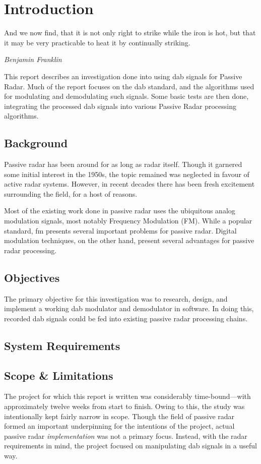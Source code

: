 \documentclass[class=report,11pt,crop=false]{standalone}
\begin{document}
\chapter{Introduction}
\epigraph{And we now find, that it is not only right to strike while the iron is hot, but that it may be very practicable to heat it by continually striking.}%
    {\emph{Benjamin Franklin}}

This report describes an investigation done into using \acrfull{dab} signals for Passive Radar. Much of the report focuses on the \acrshort{dab} standard, and the algorithms used for modulating and demodulating such signals. Some basic tests are then done, integrating the processed \acrshort{dab} signals into various Passive Radar processing algorithms.

\section{Background}
Passive radar has been around for as long as radar itself. Though it garnered some initial interest in the 1950s, the topic remained was neglected in favour of active radar systems. However, in recent decades there has been fresh excitement surrounding the field, for a host of reasons.

Most of the existing work done in passive radar uses the ubiquitous analog modulation signals, most notably Frequency Modulation (FM). While a popular standard, \acrfull{fm} presents several important problems for passive radar. Digital modulation techniques, on the other hand, present several advantages for passive radar processing.

\section{Objectives}
The primary objective for this investigation was to research, design, and implement a working \acrshort{dab} modulator and demodulator in software. In doing this, recorded \acrshort{dab} signals could be fed into existing passive radar processing chains. 

\section{System Requirements}

\section{Scope \& Limitations}
The project for which this report is written was considerably time-bound---with approximately twelve weeks from start to finish. Owing to this, the study was intentionally kept fairly narrow in scope. Though the field of passive radar formed an important underpinning for the intentions of the project, actual passive radar \emph{implementation} was not a primary focus. Instead, with the radar requirements in mind, the project focused on manipulating \acrshort{dab} signals in a useful way.
\end{document}
